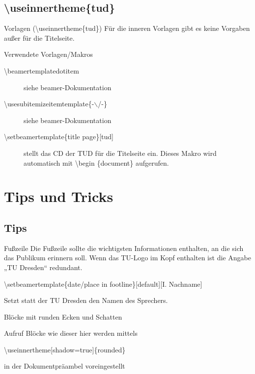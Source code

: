 \documentclass[presentation,t]{beamer}
\begin{document}
\subsection{\textbackslash useinnertheme\{tud\}}
\label{sec-2-5}

\begin{frame}[allowframebreaks,label=sec-2-5-1]{Vorlagen (\textbackslash useinnertheme\{tud\})}
Für die inneren Vorlagen gibt es keine Vorgaben außer für die
Titelseite.
\begin{block}{Verwendete Vorlagen/Makros}
\begin{description}
\item[{\textbackslash beamertemplatedotitem}] siehe beamer-Dokumentation
\item[{\textbackslash usesubitemizeitemtemplate\{-$\backslash$/-\}}] siehe
beamer-Dokumentation
\item[{\textbackslash setbeamertemplate\{title page\}[tud]}] stellt das CD
der TUD für die Titelseite ein. Dieses Makro wird automatisch mit
\textbackslash begin \{document\} aufgerufen.
\end{description}
\end{block}
\end{frame}

\section{Tips und Tricks}
\label{sec-3}
\subsection{Tips}
\label{sec-3-1}
\begin{frame}[label=sec-3-1-1]{Fußzeile}
Die Fußzeile sollte die wichtigsten Informationen enthalten, an die
sich das Publikum erinnern soll. Wenn das TU-Logo im Kopf enthalten
ist die Angabe „TU Dresden“ redundant.

\textbackslash setbeamertemplate\{date/place in
footline\}[default][I. Nachname] 

Setzt statt der TU Dresden den Namen
des Sprechers.
\end{frame}
\begin{frame}[label=sec-3-1-2]{Blöcke mit runden Ecken und Schatten}
\begin{block}{Aufruf}
Blöcke wie dieser hier werden mittels 

\textbackslash useinnertheme[shadow=true]\{rounded\}

in der Dokumentpräambel voreingestellt
\end{block}
\end{frame}
\end{document}
